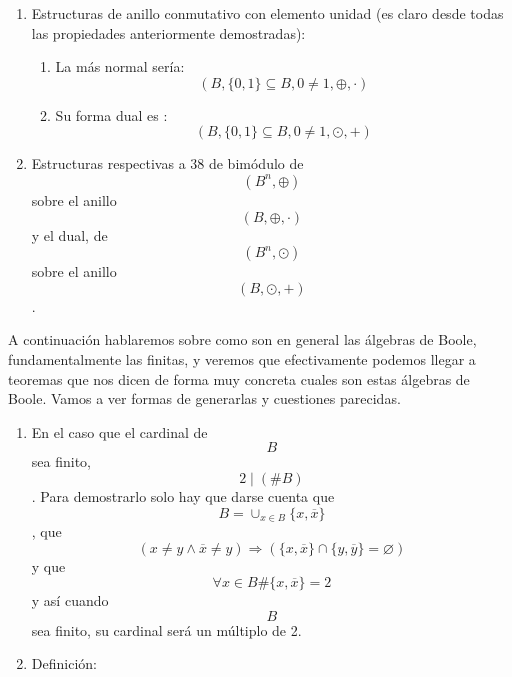 \documentclass[
]{article}
\providecommand{\tightlist}{%
  \setlength{\itemsep}{0pt}\setlength{\parskip}{0pt}}
\begin{document}
\begin{enumerate}
\begin{enumerate}
\begin{enumerate}
\begin{enumerate}
        \[{= {{({\overline{y} + {({z \cdot \overline{z}})}})} \cdot {({y + {({z \cdot \overline{z}})}})}}} =\]

        \[{= {z \cdot \overline{z}}} = 0\]

        \[\text{De}{\lbrack\mathbf{A}\rbrack}\text{y de}{\lbrack\mathbf{B}\rbrack}\text{se obtiene que}{\overline{({x+{({y\odot z})}})} = \overline{({{({x+y})}\odot{({x+z})}})}}\]

        \[\text{Y de aquí, por la unicidad del complementario obtenemos}\]

        \[{{x + {({y \odot z})}} = {({x + y})}} \odot {({x + z})}\]
      \end{enumerate}
    \item
      Estructuras de anillo conmutativo con elemento unidad (es claro
      desde todas las pro\-piedades anteriormente demostradas):

      \begin{enumerate}
      \def\labelenumiv{\arabic{enumiv}.}
      \tightlist
      \item
        La más normal sería:
        \[({B,{{\{ 0,1\}} \subseteq B},{0 \neq 1}, \oplus , \cdot})\]
      \item
        Su forma dual es
        :\[({B,{{\{ 0,1\}} \subseteq B},{0 \neq 1}, \odot , +})\]
      \end{enumerate}
    \item
      Estructuras respectivas a 38 de bimódulo
      de\[({B^{n}, \oplus})\]sobre el anillo \[({B, \oplus , \cdot})\] y
      el dual, de \[({B^{n}, \odot})\]sobre el anillo
      \[({B, \odot , +})\].
    \end{enumerate}

    A continuación hablaremos sobre como son en general las álgebras de
    Boole, funda\-mentalmente las finitas, y veremos que efectivamente
    podemos llegar a teoremas que nos dicen de forma muy concreta cuales
    son estas álgebras de Boole. Vamos a ver for\-mas de generarlas y
    cuestiones parecidas.

    \begin{enumerate}
    \def\labelenumiii{\arabic{enumiii}.}
    \setcounter{enumiii}{39}
    \item
      En el caso que el cardinal de \[B\]sea finito,
      \[2 \mid {({\# B})}\]. Para demostrarlo solo hay que darse cuenta
      que \[{B = \cup_{x \in B}}{\{{x,\overline{x}}\}}\], que
      \[{({{x \neq {y \land \overline{x}}} \neq y})}\Rightarrow{({{{\{{x,\overline{x}}\}} \cap {\{{y,\overline{y}}\}}} = \varnothing})}\]
      y que \[\forall{x \in B}\#{{\{{x,\overline{x}}\}} = 2}\] y así
      cuando\[B\]sea finito, su cardinal será un múlti\-plo de 2.
    \item
      Definición:


\end{enumerate}
\end{enumerate}
\end{enumerate}
\end{document}
